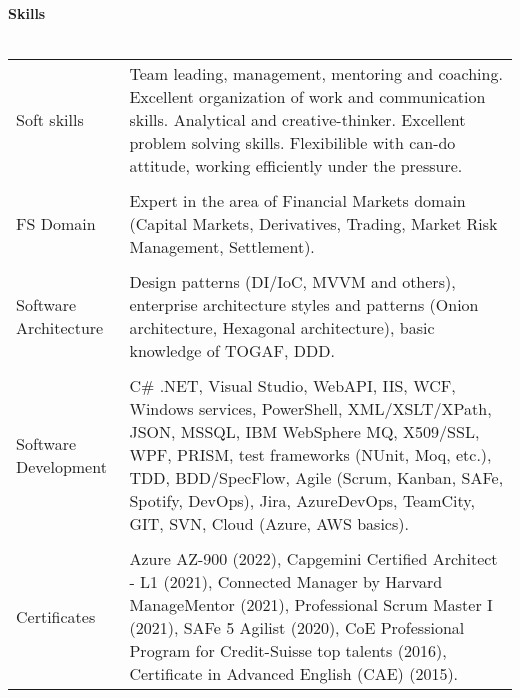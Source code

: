 \textbf{Skills}
\\
\\
\begin{tabular}{p{}|p{}}
Soft skills
& Team leading, management, mentoring and coaching. Excellent organization of work and communication skills. Analytical and creative-thinker. Excellent problem solving skills. Flexibilible with can-do attitude, working efficiently under the pressure. \\
& \\
FS Domain
& Expert in the area of Financial Markets domain (Capital Markets, Derivatives, Trading, Market Risk Management, Settlement).\\
& \\
Software Architecture
& Design patterns (DI/IoC, MVVM and others), enterprise architecture styles and patterns (Onion architecture, Hexagonal architecture), basic knowledge of TOGAF, DDD. \\
& \\
Software Development
& C\# .NET, Visual Studio, WebAPI, IIS, WCF, Windows services, PowerShell, XML/XSLT/XPath, JSON, MSSQL, IBM WebSphere MQ, X509/SSL, WPF, PRISM, test frameworks (NUnit, Moq, etc.), TDD, BDD/SpecFlow, Agile (Scrum, Kanban, SAFe, Spotify, DevOps), Jira, AzureDevOps, TeamCity, GIT, SVN, Cloud (Azure, AWS basics).\\
& \\
Certificates
& Azure AZ-900 (2022), Capgemini Certified Architect - L1 (2021), Connected Manager by Harvard ManageMentor (2021), Professional Scrum Master I (2021), SAFe 5 Agilist (2020), CoE Professional Program for Credit-Suisse top talents (2016), Certificate in Advanced English (CAE) (2015). \\
\end{tabular}
